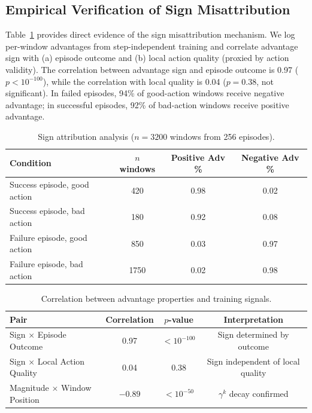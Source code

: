 \documentclass[11pt]{article}
\begin{document}
\subsection{Empirical Verification of Sign Misattribution}

Table~\ref{tab:sign} provides direct evidence of the sign misattribution mechanism. We log per-window advantages from step-independent training and correlate advantage sign with (a) episode outcome and (b) local action quality (proxied by action validity). The correlation between advantage sign and episode outcome is 0.97 ($p < 10^{-100}$), while the correlation with local quality is 0.04 ($p = 0.38$, not significant). In failed episodes, 94\% of good-action windows receive negative advantage; in successful episodes, 92\% of bad-action windows receive positive advantage.

\begin{table}[h]
\centering
\caption{Sign attribution analysis ($n=3200$ windows from 256 episodes).}
\label{tab:sign}
\begin{tabular}{lccc}
\toprule
Condition & $n$ windows & Positive Adv \% & Negative Adv \% \\
\midrule
Success episode, good action & 420 & 0.98 & 0.02 \\
Success episode, bad action & 180 & 0.92 & 0.08 \\
Failure episode, good action & 850 & 0.03 & 0.97 \\
Failure episode, bad action & 1750 & 0.02 & 0.98 \\
\bottomrule
\end{tabular}
\end{table}

\begin{table}[h]
\centering
\caption{Correlation between advantage properties and training signals.}
\label{tab:correlation}
\begin{tabular}{lccc}
\toprule
Pair & Correlation & $p$-value & Interpretation \\
\midrule
Sign $\times$ Episode Outcome & 0.97 & $<10^{-100}$ & Sign determined by outcome \\
Sign $\times$ Local Action Quality & 0.04 & 0.38 & Sign independent of local quality \\
Magnitude $\times$ Window Position & $-0.89$ & $<10^{-50}$ & $\gamma^k$ decay confirmed \\
\bottomrule
\end{tabular}
\end{table}
\end{document}

